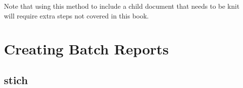 \begin{knitrout}
    \color{fgcolor}
    \begin{kframe}
        \begin{verbatim}

            \end{verbatim}
        \end{kframe}
\end{knitrout}

\noindent Note that using this method to include a child document that needs to be knit will require extra steps not covered in this book.


\section{Creating Batch Reports}

\subsection{stich}
